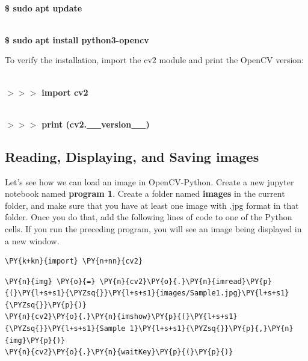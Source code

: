 \vspace{0.5cm}
\colorbox{lgray}{\\\textbf{\$ sudo apt update}}

\colorbox{lgray}{\\\textbf{\$ sudo apt install python3-opencv}}
\vspace{0.5cm}

To verify the installation, import the cv2 module and print the OpenCV version:

\vspace{0.5cm}
\colorbox{lgray}{\\\textbf{$>>>$ import cv2}}

\colorbox{lgray}{\\\textbf{$>>>$ print (cv2.\_\_version\_\_)}}
\vspace{0.5cm}

\subsection{Reading, Displaying, and Saving images}
Let's see how we can load an image in OpenCV-Python. Create a new jupyter notebook named \textbf{program 1}.  Create a folder named \textbf{images} in the current folder, and make sure that you have at least one	image with .jpg format in that folder. Once you do that, add the following lines of code to one of the Python cells. If you run the preceding program, you will see an image being displayed in a new window.

\vspace{0.2cm}

\begin{tcolorbox}[breakable, size=fbox, boxrule=1pt, pad at break*=1mm,colback=cellbackground, colframe=cellborder]
	\begin{Verbatim}[commandchars=\\\{\}]
\PY{k+kn}{import} \PY{n+nn}{cv2}
	\end{Verbatim}
\end{tcolorbox}

\begin{tcolorbox}[breakable, size=fbox, boxrule=1pt, pad at break*=1mm,colback=cellbackground, colframe=cellborder]
	\begin{Verbatim}[commandchars=\\\{\}]
\PY{n}{img} \PY{o}{=} \PY{n}{cv2}\PY{o}{.}\PY{n}{imread}\PY{p}{(}\PY{l+s+s1}{\PYZsq{}}\PY{l+s+s1}{images/Sample1.jpg}\PY{l+s+s1}{\PYZsq{}}\PY{p}{)}
\PY{n}{cv2}\PY{o}{.}\PY{n}{imshow}\PY{p}{(}\PY{l+s+s1}{\PYZsq{}}\PY{l+s+s1}{Sample 1}\PY{l+s+s1}{\PYZsq{}}\PY{p}{,}\PY{n}{img}\PY{p}{)}
\PY{n}{cv2}\PY{o}{.}\PY{n}{waitKey}\PY{p}{(}\PY{p}{)}
	\end{Verbatim}
\end{tcolorbox}

